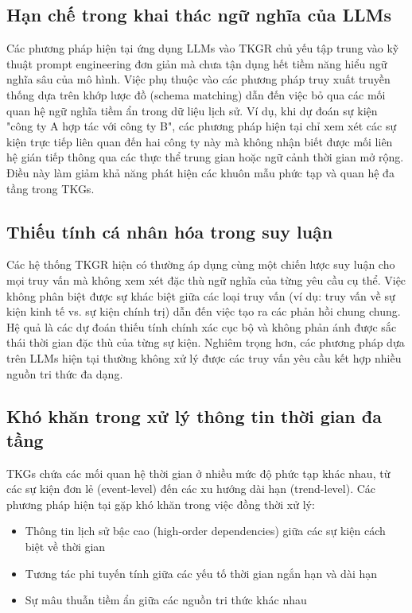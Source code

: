 \subsection{Hạn chế trong khai thác ngữ nghĩa của LLMs}
Các phương pháp hiện tại ứng dụng LLMs vào TKGR chủ yếu tập trung vào kỹ thuật prompt engineering đơn giản mà chưa tận dụng hết tiềm năng hiểu ngữ nghĩa sâu của mô hình. Việc phụ thuộc vào các phương pháp truy xuất truyền thống dựa trên khớp lược đồ (schema matching) dẫn đến việc bỏ qua các mối quan hệ ngữ nghĩa tiềm ẩn trong dữ liệu lịch sử. Ví dụ, khi dự đoán sự kiện "công ty A hợp tác với công ty B", các phương pháp hiện tại chỉ xem xét các sự kiện trực tiếp liên quan đến hai công ty này mà không nhận biết được mối liên hệ gián tiếp thông qua các thực thể trung gian hoặc ngữ cảnh thời gian mở rộng. Điều này làm giảm khả năng phát hiện các khuôn mẫu phức tạp và quan hệ đa tầng trong TKGs.

\subsection{Thiếu tính cá nhân hóa trong suy luận}
Các hệ thống TKGR hiện có thường áp dụng cùng một chiến lược suy luận cho mọi truy vấn mà không xem xét đặc thù ngữ nghĩa của từng yêu cầu cụ thể. Việc không phân biệt được sự khác biệt giữa các loại truy vấn (ví dụ: truy vấn về sự kiện kinh tế vs. sự kiện chính trị) dẫn đến việc tạo ra các phản hồi chung chung. Hệ quả là các dự đoán thiếu tính chính xác cục bộ và không phản ánh được sắc thái thời gian đặc thù của từng sự kiện. Nghiêm trọng hơn, các phương pháp dựa trên LLMs hiện tại thường không xử lý được các truy vấn yêu cầu kết hợp nhiều nguồn tri thức đa dạng.

\subsection{Khó khăn trong xử lý thông tin thời gian đa tầng}
TKGs chứa các mối quan hệ thời gian ở nhiều mức độ phức tạp khác nhau, từ các sự kiện đơn lẻ (event-level) đến các xu hướng dài hạn (trend-level). Các phương pháp hiện tại gặp khó khăn trong việc đồng thời xử lý:
\begin{itemize}
    \item Thông tin lịch sử bậc cao (high-order dependencies) giữa các sự kiện cách biệt về thời gian
    \item Tương tác phi tuyến tính giữa các yếu tố thời gian ngắn hạn và dài hạn
    \item Sự mâu thuẫn tiềm ẩn giữa các nguồn tri thức khác nhau
\end{itemize}

